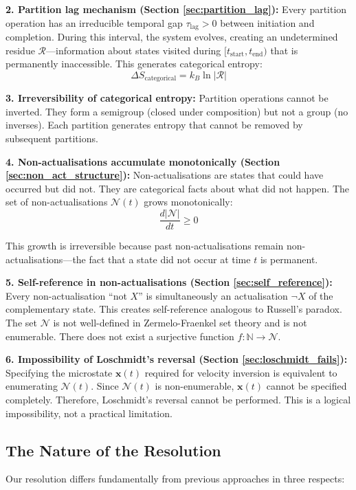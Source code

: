 \documentclass[twocolumn,10pt]{article}
\theoremstyle{definition}
\theoremstyle{remark}
\begin{document}
\textbf{2. Partition lag mechanism (Section \ref{sec:partition_lag}):} Every partition operation has an irreducible temporal gap $\tau_{\text{lag}} > 0$ between initiation and completion. During this interval, the system evolves, creating an undetermined residue $\mathcal{R}$—information about states visited during $[t_{\text{start}}, t_{\text{end}})$ that is permanently inaccessible. This generates categorical entropy:
$$
\Delta S_{\text{categorical}} = k_B \ln|\mathcal{R}|
$$

\textbf{3. Irreversibility of categorical entropy:} Partition operations cannot be inverted. They form a semigroup (closed under composition) but not a group (no inverses). Each partition generates entropy that cannot be removed by subsequent partitions.

\textbf{4. Non-actualisations accumulate monotonically (Section \ref{sec:non_act_structure}):} Non-actualisations are states that could have occurred but did not. They are categorical facts about what did not happen. The set of non-actualisations $\mathcal{N}(t)$ grows monotonically:
$$
\frac{d|\mathcal{N}|}{dt} \geq 0
$$

This growth is irreversible because past non-actualisations remain non-actualisations—the fact that a state did not occur at time $t$ is permanent.

\textbf{5. Self-reference in non-actualisations (Section \ref{sec:self_reference}):} Every non-actualisation ``not $X$'' is simultaneously an actualisation $\neg X$ of the complementary state. This creates self-reference analogous to Russell's paradox. The set $\mathcal{N}$ is not well-defined in Zermelo-Fraenkel set theory and is not enumerable. There does not exist a surjective function $f : \mathbb{N} \to \mathcal{N}$.

\textbf{6. Impossibility of Loschmidt's reversal (Section \ref{sec:loschmidt_fails}):} Specifying the microstate $\mathbf{x}(t)$ required for velocity inversion is equivalent to enumerating $\mathcal{N}(t)$. Since $\mathcal{N}(t)$ is non-enumerable, $\mathbf{x}(t)$ cannot be specified completely. Therefore, Loschmidt's reversal cannot be performed. This is a logical impossibility, not a practical limitation.

\subsection{The Nature of the Resolution}

Our resolution differs fundamentally from previous approaches in three respects:
\end{document}
